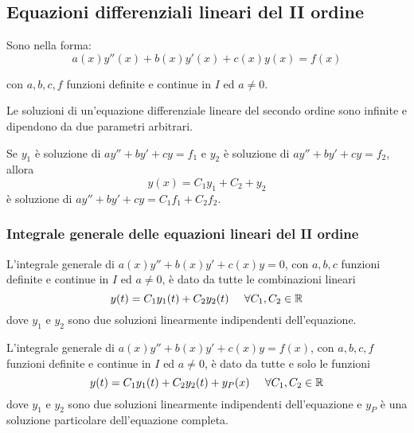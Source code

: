 \subsection{Equazioni differenziali lineari del II ordine}

Sono nella forma:
\begin{equation}
    a(x) y''(x) + b(x) y'(x) + c(x)y(x) = f(x)
\end{equation}

con $a,b,c,f$ funzioni definite e continue in $I$ ed $a \neq 0$.

Le soluzioni di un'equazione differenziale lineare del secondo ordine sono infinite e dipendono da due parametri arbitrari.

\begin{theorem}
    Se $y_1$ è soluzione di $ay'' + by' + c y = f_1$ e $y_2$ è soluzione di $ay'' + by' + c y = f_2$, allora 
    \begin{equation}
        y(x) = C_1 y_1 + C_2 + y_2
    \end{equation}
    è soluzione di $ay'' + by' + c y = C_1 f_1 + C_2 f_2$.
\end{theorem}

\subsubsection{Integrale generale delle equazioni lineari del II ordine}

\begin{theorem}
    L'integrale generale di $a(x)y'' + b(x)y' + c(x) y = 0$, con $a,b,c$ funzioni definite e continue in $I$ ed $a \neq 0$, è dato da tutte le combinazioni lineari
    \begin{equation}
        y(t) = C_1 y_1(t) + C_2 y_2(t) \mspace{25mu} \forall C_1, C_2 \in \mathbb{R}
    \end{equation}
    dove $y_1$ e $y_2$ sono due soluzioni linearmente indipendenti dell'equazione.
    \label{strut_O}
\end{theorem}

\begin{theorem}
    L'integrale generale di $a(x)y'' + b(x)y' + c(x) y = f(x)$, con $a,b,c,f$ funzioni definite e continue in $I$ ed $a \neq 0$, è dato da tutte e solo le funzioni
    \begin{equation}
        y(t) = C_1 y_1(t) + C_2 y_2(t) + y_P(x) \mspace{25mu} \forall C_1, C_2 \in \mathbb{R}
    \end{equation}
    dove $y_1$ e $y_2$ sono due soluzioni linearmente indipendenti dell'equazione e $y_P$ è una soluzione particolare dell'equazione completa.
\end{theorem}

